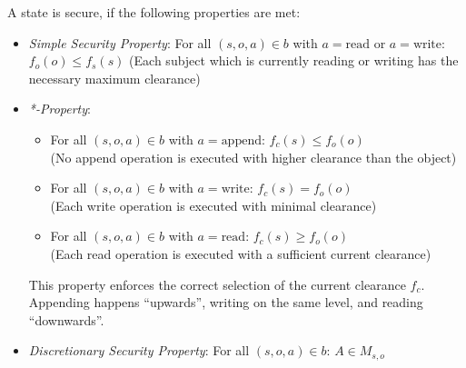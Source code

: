 A state is secure, if the following properties are met:
\begin{itemize}
    \item \emph{Simple Security Property}: For all $(s, o, a) \in b$ with
          $a=\text{read}$ or $a=\text{write}$: $f_o(o) \leq f_s(s)$ (Each
          subject which is currently reading or writing has the necessary
          maximum clearance)
    \item \emph{*-Property}:
          \begin{itemize}
              \item For all $(s,o,a)\in b$ with $a=\text{append}$: $f_c(s) \leq
                        f_o(o)$ \\ (No append operation is executed with higher
                        clearance than the object)
              \item For all $(s,o,a)\in b$ with $a=\text{write}$: $f_c(s) =
                        f_o(o)$ \\ (Each write operation is executed with
                        minimal clearance)
              \item For all $(s,o,a)\in b$ with $a=\text{read}$: $f_c(s) \geq
                        f_o(o)$ \\ (Each read operation is executed with a
                        sufficient current clearance)
          \end{itemize}
          This property enforces the correct selection of the current clearance
          $f_c$. Appending happens ``upwards'', writing on the same level, and
          reading ``downwards''.
    \item \emph{Discretionary Security Property}: For all $(s,o,a) \in b$: $A
              \in M_{s,o}$
\end{itemize}

